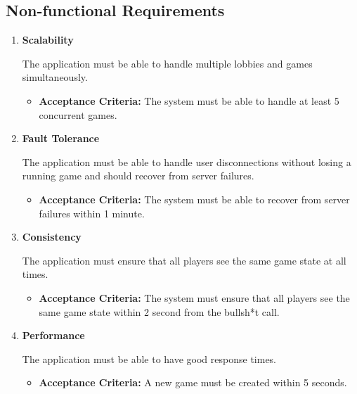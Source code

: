 \documentclass{scrartcl}
\begin{document}
\subsection{Non-functional Requirements}\label{non-functional-requirements}
\begin{enumerate}
      \item \textbf{Scalability}\par
            The application must be able to handle multiple lobbies and games simultaneously.
            \begin{itemize}
                  \item \textbf{Acceptance Criteria:} The system must be able to handle at least 5
                        concurrent games.
            \end{itemize}
      \item \textbf{Fault Tolerance}\par
            The application must be able to handle user disconnections without losing a running game
            and should recover from server failures.
            \begin{itemize}
                  \item \textbf{Acceptance Criteria:} The system must be able to recover from server
                        failures within 1 minute.
            \end{itemize}
      \item \textbf{Consistency}\par
            The application must ensure that all players see the same game state at all times.
            \begin{itemize}
                  \item \textbf{Acceptance Criteria:} The system must ensure that all players see the
                        same game state within 2 second from the bullsh*t call.
            \end{itemize}
      \item \textbf{Performance}\par
            The application must be able to have good response times.
            \begin{itemize}
                  \item \textbf{Acceptance Criteria:} A new game must be created within 5 seconds.
            \end{itemize}
\end{enumerate}
\end{document}
